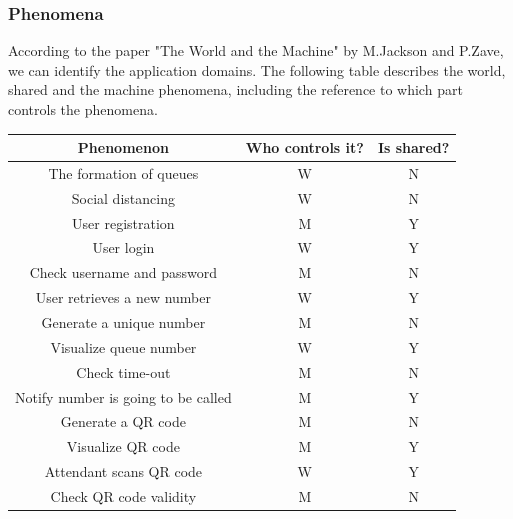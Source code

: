 \documentclass[table, 12pt]{article}
\begin{document}
\subsubsection{Phenomena}
According to the paper "The World and the Machine" by M.Jackson and P.Zave, we can identify the application domains. The following table describes the world, shared and the machine phenomena, including the reference to which part controls the phenomena.
\begin{center}
    \begin{table}
        \begin{tabularx}{\textwidth}{| c| c| c|}
            \hline
            \rowcolor{blue!50}
            Phenomenon                                 & Who controls it? & Is shared? \\
            \hline
            The formation of queues                    & W                & N          \\
            Social distancing                          & W                & N          \\
            User registration                          & M                & Y          \\
            User login                                 & W                & Y          \\
            Check username and password                & M                & N          \\
            User retrieves a new number                & W                & Y          \\
            Generate a unique number                   & M                & N          \\
            Visualize queue number                     & W                & Y          \\
            Check time-out                             & M                & N          \\
            Notify number is going to be called        & M                & Y          \\
            Generate a QR code                         & M                & N          \\
            Visualize QR code                          & M                & Y          \\
            Attendant scans QR code                    & W                & Y          \\
            Check QR code validity                     & M                & N          \\

\end{tabularx}
\end{table}
\end{center}
\end{document}
